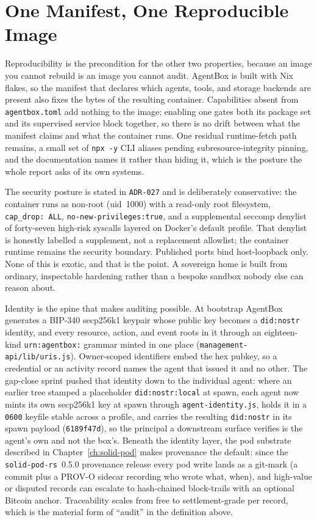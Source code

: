 \section{One Manifest, One Reproducible Image}

Reproducibility is the precondition for the other two properties, because an image you cannot rebuild is an image you cannot audit. AgentBox is built with Nix
flakes, so the manifest that declares which agents, tools, and storage backends are present also fixes the bytes of the resulting container. Capabilities absent
from \texttt{agentbox.toml} add nothing to the image; enabling one gates both its package set and its supervised service block together, so there is no drift
between what the manifest claims and what the container runs. One residual runtime-fetch path remains, a small set of \texttt{npx -y} CLI aliases pending
subresource-integrity pinning, and the documentation names it rather than hiding it, which is the posture the whole report asks of its own systems.

The security posture is stated in \texttt{ADR-027} and is deliberately conservative: the container runs as non-root (uid~1000) with a read-only root filesystem,
\texttt{cap\_drop:~ALL}, \texttt{no-new-privileges:true}, and a supplemental seccomp denylist of forty-seven high-risk syscalls layered on Docker's default
profile. That denylist is honestly labelled a supplement, not a replacement allowlist; the container runtime remains the security boundary. Published ports bind
host-loopback only. None of this is exotic, and that is the point. A sovereign home is built from ordinary, inspectable hardening rather than a bespoke sandbox
nobody else can reason about.

Identity is the spine that makes auditing possible. At bootstrap AgentBox generates a BIP-340 secp256k1 keypair whose public key becomes a \texttt{did:nostr}
identity, and every resource, action, and event roots in it through an eighteen-kind \texttt{urn:agentbox:} grammar minted in one place
(\texttt{management-api/lib/uris.js}). Owner-scoped identifiers embed the hex pubkey, so a credential or an activity record names the agent that issued it and
no other. The gap-close sprint pushed that identity down to the individual agent: where an earlier tree stamped a placeholder \texttt{did:nostr:local} at
spawn, each agent now mints its own secp256k1 key at spawn through \texttt{agent-identity.js}, holds it in a \texttt{0600} keyfile stable across a profile, and
carries the resulting \texttt{did:nostr} in its spawn payload (\texttt{6189f47d}), so the principal a downstream surface verifies is the agent's own and not the
box's. Beneath the identity layer, the pod substrate described in Chapter~\ref{ch:solid-pod} makes provenance the default: since the
\texttt{solid-pod-rs}~0.5.0 provenance release every pod write lands as a git-mark (a commit plus a PROV-O sidecar recording who wrote what, when), and
high-value or disputed records can escalate to hash-chained block-trails with an optional Bitcoin anchor. Traceability scales from free to settlement-grade per
record, which is the material form of ``audit'' in the definition above.

